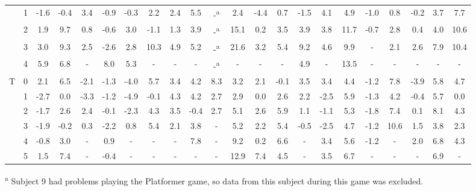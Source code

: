 \begin{table*}[!h]
{\begin{tabular}{|c|c|c|c|c|c|c|c|c|c|c|c|c|c|c|c|c|c|c|c|c|c|}
                      & 1   & -1.6 & -0.4 & 3.4  & -0.9 & -0.3  & 2.2  & 2.4  & 5.5  & -\textsuperscript{a}   & 2.4  & -4.4  & 0.7    & -1.5 & 4.1  & 4.9  & -1.0 & 0.8  & -0.2 & 3.7  & 7.7  \\
                      & 2   & 1.9  & 9.7  & 0.8  & -0.6 & 3.0   & -1.1 & 1.3  & 3.9  & -\textsuperscript{a}   & 15.1 & 0.2   & 3.5    & 3.9  & 3.8  & 11.7 & -0.7 & 2.8  & 0.4  & 4.0  & 10.6 \\
                      & 3   & 3.0  & 9.3  & 2.5  & -2.6 & 2.8   & 10.3 & 4.9  & 5.2  & -\textsuperscript{a}   & 21.6 & 3.2   & 5.4    & 9.2  & 4.6  & 9.9  & -    & 2.1  & 2.6  & 7.9  & 10.4 \\
                      & 4   & 5.9  & 6.8  & -    & 8.0  & 5.3   & -    & -    & -    & -\textsuperscript{a}   & -    & -     & -      & 4.9  & -    & 13.5 & -    & -    & -    & -    & -     \\
\hline
\multirow{6}{*}{T}    & 0   & 2.1  & 6.5  & -2.1 & -1.3 & -4.0  & 5.7  & 3.4  & 4.2  & 8.3  & 3.2  & 2.1   & -0.1  & 3.5  & 3.4  & 4.4  & -1.2 & 7.8  & -3.9 & 5.8  & 4.7  \\
                      & 1   & -2.7 & 0.0  & -3.3 & -1.2 & -4.9  & -0.1 & 4.3  & 4.2  & 2.7  & 2.9  & 0.0   & 2.6   & 2.2  & -2.5 & 5.9  & -1.3 & 4.2  & -0.4 & 5.7  & 0.0 \\
                      & 2   & -1.7 & 2.6  & 2.4  & -0.1 & -2.3  & 4.3  & 3.5  & -0.4 & 2.7  & 5.1  & 2.6   & 5.9   & 1.1  & -1.1 & 5.3  & -1.8 & 7.4  & 0.1  & 8.1  & 4.3  \\
                      & 3   & -1.9 & -0.2 & 0.3  & -2.2 & 0.8   & 5.4  & 2.1  & 3.8  & -    & 5.2  & 2.2   & 5.4   & -0.5 & -2.5 & 4.7  & -1.2 & 10.6 & 1.5  & 3.8  & 2.3  \\
                      & 4   & -0.8 & 3.0  & -    & 0.9  & -     & -    & -    & 7.8  & -    & 9.2  & 0.2   & 6.6   & -    & 3.4  & 5.6  & -1.2 & -    & 2.0  & 6.8  & 4.3  \\
                      & 5   & 1.5  & 7.4  & -    & -0.4 & -     & -    & -    & -    & -    & 12.9 & 7.4   & 4.5   & -    & 3.5  & 6.7  & -    & -    & -    & 6.9  & -    \\
\hline
\end{tabular}
}
\raggedright{\textsuperscript{a} Subject 9 had problems playing the Platformer game, so data from this subject during this game was excluded.}
\end{table*}

